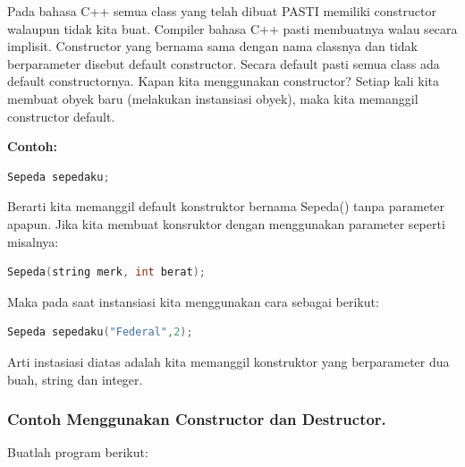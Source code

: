 Pada bahasa C++ semua class yang telah dibuat PASTI memiliki constructor
walaupun tidak kita buat. Compiler bahasa C++ pasti membuatnya walau
secara implisit. Constructor yang bernama sama dengan nama classnya dan
tidak berparameter disebut default constructor. Secara default pasti
semua class ada default constructornya. Kapan kita menggunakan
constructor? Setiap kali kita membuat obyek baru (melakukan instansiasi
obyek), maka kita memanggil constructor default.

\textbf{Contoh:}

\begin{lstlisting}[language=c++, numbers=none]
Sepeda sepedaku;
\end{lstlisting}

Berarti kita memanggil default konstruktor bernama Sepeda() tanpa
parameter apapun. Jika kita membuat konsruktor dengan menggunakan
parameter seperti misalnya:

\begin{lstlisting}[language=c++, numbers=none]
Sepeda(string merk, int berat);
\end{lstlisting}

Maka pada saat instansiasi kita menggunakan cara sebagai berikut:

\begin{lstlisting}[language=c++, numbers=none]
Sepeda sepedaku("Federal",2);
\end{lstlisting}

Arti instasiasi diatas adalah kita memanggil konstruktor yang
berparameter dua buah, string dan integer.

\subsubsection*{Contoh  Menggunakan Constructor dan Destructor.}

Buatlah program berikut:

